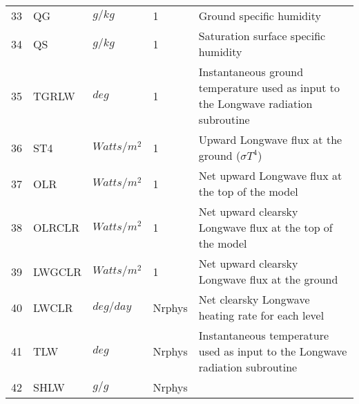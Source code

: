 \begin{tabular}{lllll}
33 & QG        &  $g/kg$ &  1
         &\begin{minipage}[t]{3in}
          {Ground specific humidity}
         \end{minipage}\\
34 & QS        &  $g/kg$ &  1
         &\begin{minipage}[t]{3in}
          {Saturation surface specific humidity}
         \end{minipage}\\
35 & TGRLW    &    $deg$   &    1  
         &\begin{minipage}[t]{3in}
          {Instantaneous ground temperature used as input to the
           Longwave radiation subroutine} 
         \end{minipage}\\
36 & ST4      &   $Watts/m^2$  &    1  
         &\begin{minipage}[t]{3in}
          {Upward Longwave flux at the ground ($\sigma T^4$)}
         \end{minipage}\\
37 & OLR      &   $Watts/m^2$  &    1  
         &\begin{minipage}[t]{3in}
          {Net upward Longwave flux at the top of the model}
         \end{minipage}\\
38 & OLRCLR   &   $Watts/m^2$  &    1  
         &\begin{minipage}[t]{3in}
          {Net upward clearsky Longwave flux at the top of the model}
         \end{minipage}\\
39 & LWGCLR   &   $Watts/m^2$  &    1  
         &\begin{minipage}[t]{3in}
          {Net upward clearsky Longwave flux at the ground}
         \end{minipage}\\
40 & LWCLR    &  $deg/day$ &  Nrphys 
         &\begin{minipage}[t]{3in}
          {Net clearsky Longwave heating rate for each level}
         \end{minipage}\\
41 & TLW      &    $deg$   &  Nrphys 
         &\begin{minipage}[t]{3in}
          {Instantaneous temperature used as input to the Longwave radiation
          subroutine} 
         \end{minipage}\\
42 & SHLW     &    $g/g$   &  Nrphys 

\end{tabular}
